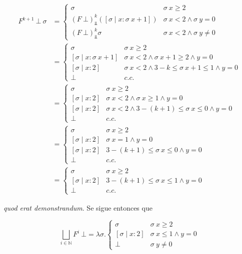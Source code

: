\documentclass[article, 12pt]{article}
\begin{document}
\begin{align*}
  F^{k+1} ~ \bot ~ \sigma 
  &= \begin{cases}
    \sigma & \sigma ~ x \geq 2 \\ 
    (F ~ \bot )^k_{\Bot} \left( [\sigma \mid x : \sigma ~ x + 1] \right)  & \sigma ~ x < 2
    \land \sigma ~ y = 0 \\
    (F ~ \bot )^k_{\Bot} \sigma  & \sigma ~ x < 2 \land \sigma ~ y \neq 0
  \end{cases} \\ 
  &=\begin{cases}
    \sigma & \sigma ~ x \geq 2 \\ 
    [\sigma \mid x : \sigma ~ x + 1 ] & \sigma ~ x < 2\land \sigma ~ x + 1 \geq
    2 \land  y = 0 \\
    [\sigma \mid x : 2] & \sigma ~ x < 2 \land  3 - k \leq \sigma ~ x + 1 \leq 1 \land  y = 0 \\ 
    \bot & c.c.
  \end{cases} \\ 
  &=\begin{cases}
    \sigma & \sigma ~ x \geq 2 \\ 
    [\sigma \mid x : 2] & \sigma ~ x < 2 \land  \sigma ~ x \geq 1 \land  y  =0
    \\ 
    [\sigma \mid x : 2] & \sigma ~ x < 2 \land 3 - (k+1) \leq \sigma ~ x \leq 0
    \land  y  = 0 \\ 
    \bot  &c.c.
  \end{cases}\\
  &=\begin{cases}
    \sigma & \sigma ~ x \geq 2 \\ 
    [\sigma \mid x : 2] & \sigma ~ x = 1\land   y  =0
    \\ 
    [\sigma \mid x : 2] & 3 - (k+1) \leq \sigma ~ x \leq 0
    \land  y  = 0 \\ 
    \bot  &c.c.
  \end{cases}\\
  &=\begin{cases}
    \sigma & \sigma ~ x \geq 2 \\ 
    [\sigma \mid x : 2] & 3 - (k+1) \leq \sigma ~ x \leq 1
    \land  y  = 0 \\ 
    \bot  &c.c.
  \end{cases}
\end{align*}

\textit{quod erat demonstrandum}. Se sigue entonces que 

\begin{equation*}
  \bigsqcup_{i \in \mathbb{N}} F^{i} ~ \bot = \lambda \sigma . \begin{cases}
    \sigma & \sigma ~ x \geq 2 \\ 
    [\sigma \mid x : 2] &\sigma ~ x \leq 1 \land  y = 0 \\ 
    \bot & \sigma ~ y \neq 0
  \end{cases}
\end{equation*}
\end{document}
